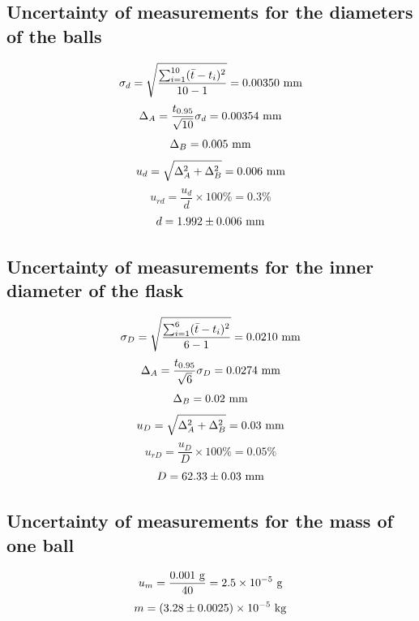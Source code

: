 \documentclass[a4paper]{report}
\begin{document}
	\subsection{Uncertainty of measurements for the diameters of the balls}
	\begin{equation*}
	\sigma_d=\sqrt{\dfrac{\sum_{i=1}^{10}(\bar{t}-t_i)^2}{10-1}}=0.00350\ \rm{mm}
	\end{equation*}
	\begin{equation*}
	\Delta_A=\dfrac{t_{0.95}}{\sqrt{10}}\sigma_d=0.00354\ \rm{mm}
	\end{equation*}
	\begin{equation*}
	\Delta_B=0.005\ \rm{mm}
	\end{equation*}
	\begin{equation*}
	u_d=\sqrt{\Delta_A^2+\Delta_B^2}=0.006\ \rm{mm}
	\end{equation*}
	\begin{equation*}
	u_{rd}=\dfrac{u_d}{d}\times100\%=0.3\%
	\end{equation*}
	\begin{equation*}
	d=1.992\pm0.006\ \rm{mm}
	\end{equation*}
	\subsection{Uncertainty of measurements for the inner diameter of the flask}
	\begin{equation*}
	\sigma_D=\sqrt{\dfrac{\sum_{i=1}^{6}(\bar{t}-t_i)^2}{6-1}}=0.0210\ \rm{mm}
	\end{equation*}
	\begin{equation*}
	\Delta_A=\dfrac{t_{0.95}}{\sqrt{6}}\sigma_D=0.0274\ \rm{mm}
	\end{equation*}
	\begin{equation*}
	\Delta_B=0.02\ \rm{mm}
	\end{equation*}
	\begin{equation*}
	u_D=\sqrt{\Delta_A^2+\Delta_B^2}=0.03\ \rm{mm}
	\end{equation*}
	\begin{equation*}
	u_{rD}=\dfrac{u_D}{D}\times100\%=0.05\%
	\end{equation*}
	\begin{equation*}
	D=62.33\pm0.03\ \rm{mm}
	\end{equation*}
	\subsection{Uncertainty of measurements for the mass of one ball}
	\begin{equation*}
	u_m=\dfrac{0.001\ \rm{g}}{40}=2.5\times10^{-5}\ \rm{g}
	\end{equation*}
	\begin{equation*}
	m=(3.28\pm0.0025)\times10^{-5}\ \rm{kg}
	\end{equation*}
\end{document}

